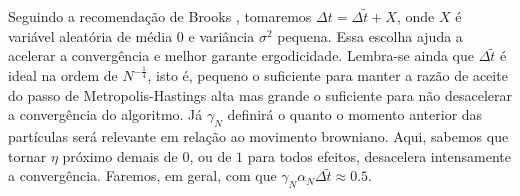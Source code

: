  Seguindo a recomendação de Brooks \cite[Capítulo~5]{handbookmontecarlo}, tomaremos $\Delta t = \Delta\tilde{t} + X$, onde $X$ é variável aleatória de média $0$ e variância $\sigma^2$ pequena. Essa escolha ajuda a acelerar a convergência e melhor garante ergodicidade. Lembra-se ainda que $\Delta \tilde{t}$ é ideal na ordem de $N^{-\frac{1}{4}}$, isto é,  pequeno o suficiente para manter a razão de aceite do passo de Metropolis-Hastings alta mas grande o suficiente para não desacelerar a convergência do algoritmo. Já $\gamma_N$ definirá o quanto o momento anterior das partículas será relevante em relação ao movimento browniano. Aqui, sabemos que tornar $\eta$ próximo demais de $0$, ou de $1$ para todos efeitos, desacelera intensamente a convergência. Faremos, em geral, com que $\gamma_N \alpha_N \Delta \tilde{t} \approx 0.5$.
 


